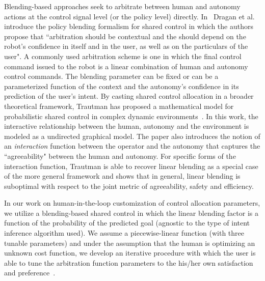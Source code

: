 \documentclass[12pt]{article}
\begin{document}
Blending-based approaches seek to arbitrate between human and autonomy actions at the control signal level (or the policy level) directly. In~\cite{dragan2013policy} Dragan et al. introduce the policy blending formalism for shared control in which the authors propose that ``arbitration should be contextual and the should depend on the robot's confidence in itself and in the user, as well as on the particulars of the user". A commonly used arbitration scheme is one in which the final control command issued to the robot is a linear combination of human and autonomy control commands. The blending parameter can be fixed or can be a parameterized function of the context and the autonomy's confidence in its prediction of the user's intent.  By casting shared control allocation in a broader theoretical framework, Trautman has proposed a mathematical model for probabilistic shared control in complex dynamic environments~\cite{trautman2015assistive}. In this work, the interactive relationship between the human, autonomy and the environment is modeled as a undirected graphical model. The paper also introduces the notion of an \textit{interaction} function between the operator and the autonomy that captures the ``agreeability" between the human and autonomy. For specific forms of the interaction function, Trautman is able to recover linear blending as a special case of the more general framework and shows that in general, linear blending is suboptimal with respect to the joint metric of agreeability, safety and efficiency. 

In our work on human-in-the-loop customization of control allocation parameters, we utilize a blending-based shared control in which the linear blending factor is a function of the probability of the predicted goal (agnostic to the type of intent inference algorithm used). We assume a piecewise-linear function (with three tunable parameters) and under the assumption that the human is optimizing an unknown cost function, we develop an iterative procedure with which the user is able to tune the arbitration function parameters to the his/her own satisfaction and preference~\cite{gopinath2017human}.
\end{document}
